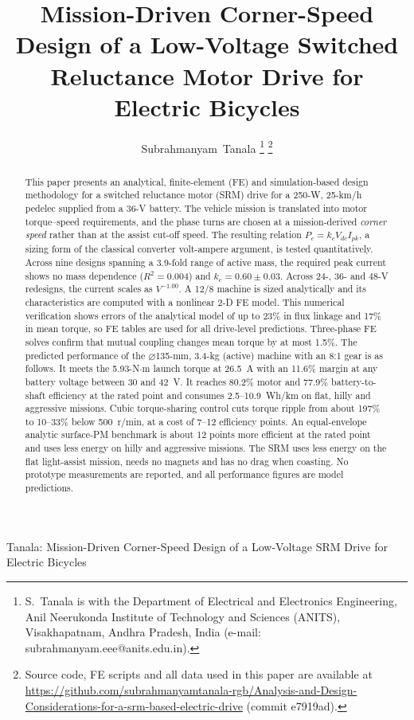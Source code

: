 \documentclass[journal]{IEEEtran}
\begin{document}
\title{Mission-Driven Corner-Speed Design of a Low-Voltage Switched Reluctance Motor Drive for Electric Bicycles}

\author{Subrahmanyam~Tanala%
\thanks{S.~Tanala is with the Department of Electrical and Electronics Engineering, Anil Neerukonda Institute of Technology and Sciences (ANITS), Visakhapatnam, Andhra Pradesh, India (e-mail: subrahmanyam.eee@anits.edu.in).}%
\thanks{Source code, FE scripts and all data used in this paper are available at \url{https://github.com/subrahmanyamtanala-rgb/Analysis-and-Design-Considerations-for-a-srm-based-electric-drive} (commit e7919ad).}}

%
{Tanala: Mission-Driven Corner-Speed Design of a Low-Voltage SRM Drive for Electric Bicycles}

\maketitle

\begin{abstract}
This paper presents an analytical, finite-element (FE) and simulation-based
design methodology for a switched reluctance motor (SRM) drive for a 250-W,
25-km/h pedelec supplied from a 36-V battery. The vehicle mission is translated
into motor torque--speed requirements, and the phase turns are chosen at a
mission-derived \emph{corner speed} rather than at the assist cut-off speed.
The resulting relation $P_c=k_cV_{dc}I_{pk}$, a sizing form of the classical
converter volt-ampere argument, is tested quantitatively. Across nine designs
spanning a 3.9-fold range of active mass, the required peak current shows no
mass dependence ($R^2=0.004$) and $k_c=0.60\pm0.03$. Across 24-, 36- and 48-V
redesigns, the current scales as $V^{-1.00}$. A 12/8 machine is sized
analytically and its characteristics are computed with a nonlinear 2-D FE
model. This numerical verification shows errors of the analytical model of up
to 23\% in flux linkage and 17\% in mean torque, so FE tables are used for all
drive-level predictions. Three-phase FE solves confirm that mutual coupling
changes mean torque by at most 1.5\%. The predicted performance of the
$\varnothing$135-mm, 3.4-kg (active) machine with an 8:1 gear is as follows. It
meets the 5.93-N$\cdot$m launch torque at 26.5~A with an 11.6\% margin at any
battery voltage between 30 and 42~V. It reaches 80.2\% motor and 77.9\%
battery-to-shaft efficiency at the rated point and consumes 2.5--10.9~Wh/km on
flat, hilly and aggressive missions. Cubic torque-sharing control cuts torque
ripple from about 197\% to 10--33\% below 500~r/min, at a cost of 7--12
efficiency points. An equal-envelope analytic surface-PM benchmark is about
12 points more efficient at the rated point and uses less energy on hilly and
aggressive missions. The SRM uses less energy on the flat light-assist
mission, needs no magnets and has no drag when coasting. No prototype
measurements are reported, and all performance figures are model predictions.
\end{abstract}
\end{document}
